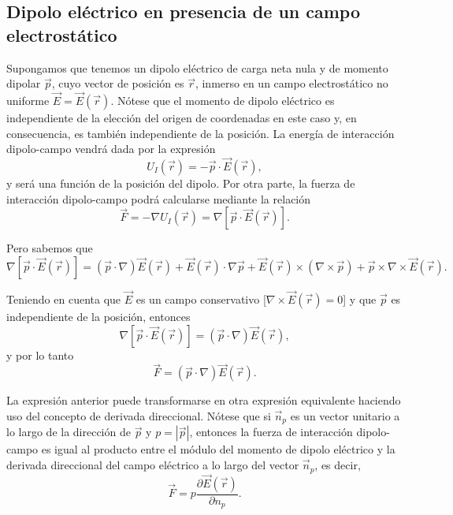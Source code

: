 \documentclass[12pt,a4paper]{book}
\begin{document}
\subsection{Dipolo eléctrico en presencia de un campo electrostático}

Supongamos que tenemos un dipolo eléctrico de carga neta nula y de momento dipolar $\vec{p}$, cuyo vector de posición es $\vec{r}$, inmerso en un campo electrostático no uniforme $\vec{E} = \vec{E}(\vec{r})$. Nótese que el momento de dipolo eléctrico es independiente de la elección del origen de coordenadas en este caso y, en consecuencia, es también independiente de la posición. La energía de interacción dipolo-campo vendrá dada por la expresión
\begin{equation}
U_I(\vec{r}) = -\vec{p} \cdot \vec{E}(\vec{r}),
\end{equation}
y será una función de la posición del dipolo. Por otra parte, la fuerza de interacción dipolo-campo podrá calcularse mediante la relación
\begin{equation}
\vec{F} = -\nabla U_I(\vec{r}) = \nabla[\vec{p} \cdot \vec{E}(\vec{r})].
\end{equation}

Pero sabemos que
\begin{equation}
\nabla[\vec{p} \cdot \vec{E}(\vec{r})] = (\vec{p} \cdot \nabla)\vec{E}(\vec{r}) + \vec{E}(\vec{r}) \cdot \nabla\vec{p} + \vec{E}(\vec{r}) \times (\nabla \times \vec{p}) + \vec{p} \times \nabla \times \vec{E}(\vec{r}).
\end{equation}

Teniendo en cuenta que $\vec{E}$ es un campo conservativo [$\nabla \times \vec{E}(\vec{r}) = 0$] y que $\vec{p}$ es independiente de la posición, entonces
\begin{equation}
\nabla[\vec{p} \cdot \vec{E}(\vec{r})] = (\vec{p} \cdot \nabla)\vec{E}(\vec{r}),
\end{equation}
y por lo tanto
\begin{equation}
\vec{F} = (\vec{p} \cdot \nabla)\vec{E}(\vec{r}).
\end{equation}

La expresión anterior puede transformarse en otra expresión equivalente haciendo uso del concepto de derivada direccional. Nótese que si $\vec{n}_p$ es un vector unitario a lo largo de la dirección de $\vec{p}$ y $p = |\vec{p}|$, entonces la fuerza de interacción dipolo-campo es igual al producto entre el módulo del momento de dipolo eléctrico y la derivada direccional del campo eléctrico a lo largo del vector $\vec{n}_p$, es decir,
\begin{equation}
\vec{F} = p\frac{\partial \vec{E}(\vec{r})}{\partial n_p}.
\end{equation}
\end{document}
